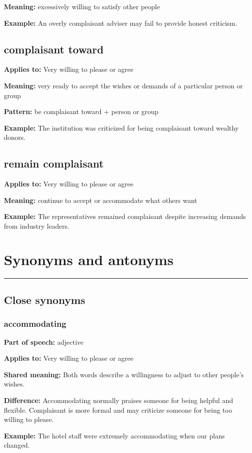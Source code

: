 \documentclass[11pt]{article}
\newcommand{\sectionrule}{\par\vspace{-0.5em}\noindent\textcolor{Accent}{\rule{\linewidth}{0.6pt}}\par}
\begin{document}
\textbf{Meaning:} excessively willing to satisfy other people

\textbf{Example:} An overly complaisant adviser may fail to provide honest criticism.

\subsection{complaisant toward}
\textbf{Applies to:} Very willing to please or agree

\textbf{Meaning:} very ready to accept the wishes or demands of a particular person or group

\textbf{Pattern:} be complaisant toward + person or group

\textbf{Example:} The institution was criticized for being complaisant toward wealthy donors.

\subsection{remain complaisant}
\textbf{Applies to:} Very willing to please or agree

\textbf{Meaning:} continue to accept or accommodate what others want

\textbf{Example:} The representatives remained complaisant despite increasing demands from industry leaders.

\section{Synonyms and antonyms}
\sectionrule
\subsection{Close synonyms}
\subsubsection{accommodating}
\textbf{Part of speech:} adjective

\textbf{Applies to:} Very willing to please or agree

\textbf{Shared meaning:} Both words describe a willingness to adjust to other people's wishes.

\textbf{Difference:} Accommodating normally praises someone for being helpful and flexible. Complaisant is more formal and may criticize someone for being too willing to please.

\textbf{Example:} The hotel staff were extremely accommodating when our plans changed.
\end{document}
